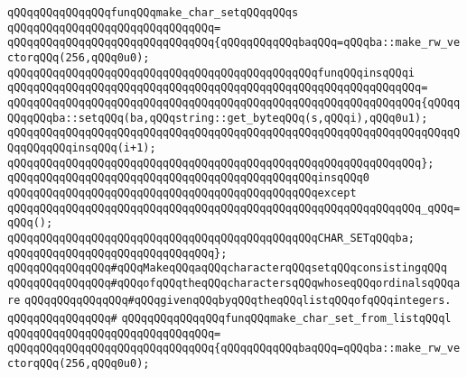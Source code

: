 \verb|qQQqqQQqqQQqqQQqfunqQQqmake_char_setqQQqqQQqs|\newline
\verb|qQQqqQQqqQQqqQQqqQQqqQQqqQQqqQQq=|\newline
\verb|qQQqqQQqqQQqqQQqqQQqqQQqqQQqqQQq{qQQqqQQqqQQqbaqQQq=qQQqba::make_rw_vectorqQQq(256,qQQq0u0);|\newline
\newline
\verb|qQQqqQQqqQQqqQQqqQQqqQQqqQQqqQQqqQQqqQQqqQQqqQQqfunqQQqinsqQQqi|\newline
\verb|qQQqqQQqqQQqqQQqqQQqqQQqqQQqqQQqqQQqqQQqqQQqqQQqqQQqqQQqqQQqqQQq=|\newline
\verb|qQQqqQQqqQQqqQQqqQQqqQQqqQQqqQQqqQQqqQQqqQQqqQQqqQQqqQQqqQQqqQQq{qQQqqQQqqQQqba::setqQQq(ba,qQQqstring::get_byteqQQq(s,qQQqi),qQQq0u1);|\newline
\verb|qQQqqQQqqQQqqQQqqQQqqQQqqQQqqQQqqQQqqQQqqQQqqQQqqQQqqQQqqQQqqQQqqQQqqQQqqQQqqQQqinsqQQq(i+1);|\newline
\verb|qQQqqQQqqQQqqQQqqQQqqQQqqQQqqQQqqQQqqQQqqQQqqQQqqQQqqQQqqQQqqQQq};|\newline
\newline
\verb|qQQqqQQqqQQqqQQqqQQqqQQqqQQqqQQqqQQqqQQqqQQqqQQqinsqQQq0|\newline
\verb|qQQqqQQqqQQqqQQqqQQqqQQqqQQqqQQqqQQqqQQqqQQqqQQqexcept|\newline
\verb|qQQqqQQqqQQqqQQqqQQqqQQqqQQqqQQqqQQqqQQqqQQqqQQqqQQqqQQqqQQqqQQq_qQQq=qQQq();|\newline
\newline
\verb|qQQqqQQqqQQqqQQqqQQqqQQqqQQqqQQqqQQqqQQqqQQqqQQqCHAR_SETqQQqba;|\newline
\verb|qQQqqQQqqQQqqQQqqQQqqQQqqQQqqQQq};|\newline
\newline
\verb|qQQqqQQqqQQqqQQq#qQQqMakeqQQqaqQQqcharacterqQQqsetqQQqconsistingqQQq|\newline
\verb|qQQqqQQqqQQqqQQq#qQQqofqQQqtheqQQqcharactersqQQqwhoseqQQqordinalsqQQqare|\newline
\verb|qQQqqQQqqQQqqQQq#qQQqgivenqQQqbyqQQqtheqQQqlistqQQqofqQQqintegers.|\newline
\verb|qQQqqQQqqQQqqQQq#|\newline
\verb|qQQqqQQqqQQqqQQqfunqQQqmake_char_set_from_listqQQql|\newline
\verb|qQQqqQQqqQQqqQQqqQQqqQQqqQQqqQQq=|\newline
\verb|qQQqqQQqqQQqqQQqqQQqqQQqqQQqqQQq{qQQqqQQqqQQqbaqQQq=qQQqba::make_rw_vectorqQQq(256,qQQq0u0);|\newline
\newline
